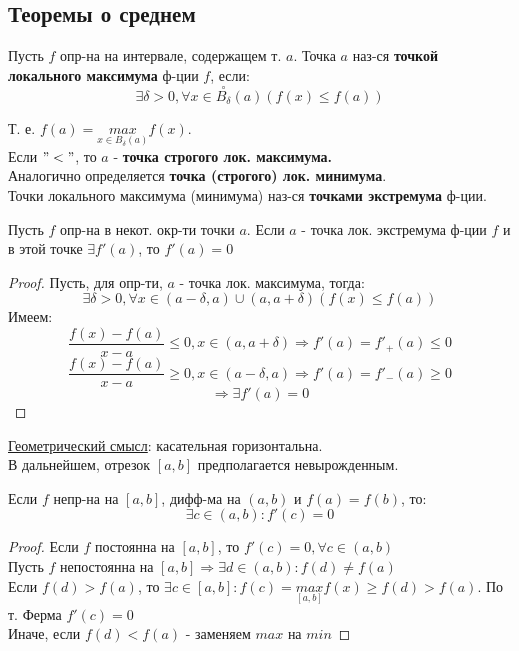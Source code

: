 \subsection{Теоремы о среднем}
\begin{definition}
Пусть $f$ опр-на на интервале, содержащем т. $a$. Точка $a$ наз-ся \textbf{точкой локального максимума} ф-ции $f$, если:
\[
\exists \delta > 0, \forall x \in \overset{\circ}{B_{\delta}}(a) \left(f(x) \leq f(a)\right)
\]

Т. е. $f(a) = \underset{x \in B_{\delta}(a)}{max} f(x)$. \\

Если $"<"$, то $a$ - \textbf{точка строгого лок. максимума.} \\

Аналогично определяется \textbf{точка (строгого) лок. минимума}. \\

Точки локального максимума (минимума) наз-ся \textbf{точками экстремума} ф-ции.
\end{definition}
\begin{theorem}
Пусть $f$ опр-на в некот. окр-ти точки $a$. Если $a$ - точка лок. экстремума ф-ции $f$ и в этой точке $\exists f'(a)$, то $f'(a) = 0$
\end{theorem}
\begin{proof}
Пусть, для опр-ти, $a$ - точка лок. максимума, тогда:
\[
\exists \delta > 0, \forall x \in (a - \delta, a) \cup (a, a + \delta) \left(f(x) \leq f(a)\right)
\]
Имеем:
\[
  \frac{f(x) - f(a)}{x - a} \leq 0, x \in (a, a + \delta) \Rightarrow f'(a) = f'_+(a) \leq 0
\]
\[
  \frac{f(x) - f(a)}{x - a} \geq 0, x \in (a - \delta, a) \Rightarrow f'(a) = f'_-(a) \geq 0
\]
\[
\Rightarrow \exists f'(a) = 0
\]
\end{proof}
\underline{Геометрический смысл}: касательная горизонтальна. \\
В дальнейшем, отрезок $[a, b]$ предполагается невырожденным.
\begin{theorem}[Ролля]
Если $f$ непр-на на $[a, b]$, дифф-ма на $(a, b)$ и $f(a) = f(b)$, то:
\[
\exists c \in (a, b) \colon f'(c) = 0
\]
\end{theorem}
\begin{proof}
Если $f$ постоянна на $[a, b]$, то $f'(c) = 0, \forall c \in (a, b)$ \\
Пусть $f$ непостоянна на $[a, b] \Rightarrow \exists d \in (a, b) \colon f(d) \neq f(a)$ \\
Если $f(d) > f(a)$, то $\exists c \in [a, b] \colon f(c) = \underset{[a, b]}{max} f(x) \geq f(d) > f(a)$. По т. Ферма $f'(c) = 0$ \\
 Иначе, если $f(d) < f(a)$ - заменяем $max$ на $min$
\end{proof} 
